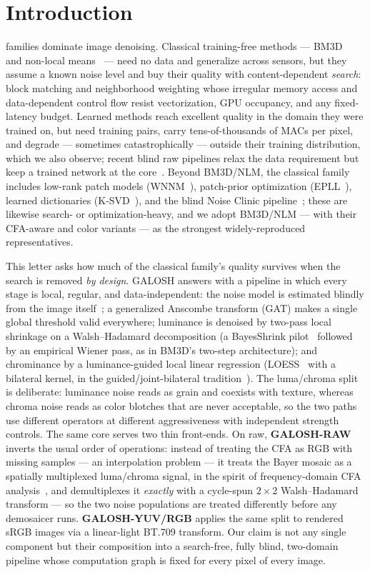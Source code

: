 \documentclass[journal]{IEEEtran}
\begin{document}
\section{Introduction}
 families dominate image denoising. Classical
training-free methods --- BM3D~\cite{bm3d} and non-local means~\cite{nlm} ---
need no data and generalize across sensors, but they assume a known noise
level and buy their quality with content-dependent \emph{search}: block
matching and neighborhood weighting whose irregular memory access and
data-dependent control flow resist vectorization, GPU occupancy, and any
fixed-latency budget. Learned methods reach excellent quality in the domain
they were trained on, but need training pairs, carry tens-of-thousands of MACs
per pixel, and degrade --- sometimes catastrophically --- outside their
training distribution, which we also observe; recent blind raw pipelines
relax the data requirement but keep a trained network at the
core~\cite{yond,noise2vst}. Beyond BM3D/NLM, the classical
family includes low-rank patch models (WNNM~\cite{wnnm}), patch-prior
optimization (EPLL~\cite{epll}), learned dictionaries (K-SVD~\cite{ksvd}), and
the blind Noise Clinic pipeline~\cite{noiseclinic}; these are likewise search-
or optimization-heavy, and we adopt BM3D/NLM --- with their CFA-aware and
color variants --- as the strongest widely-reproduced representatives.

This letter asks how much of the classical family's quality survives when the
search is removed \emph{by design}. GALOSH answers with a pipeline in which
every stage is local, regular, and data-independent: the noise model is
estimated blindly from the image itself~\cite{foi}; a generalized Anscombe
transform (GAT) makes a single global threshold valid everywhere; luminance is
denoised by two-pass local shrinkage on a Walsh--Hadamard decomposition
(a BayesShrink pilot~\cite{bayesshrink} followed by an empirical Wiener pass,
as in BM3D's two-step architecture); and chrominance by a luminance-guided
local linear regression (LOESS~\cite{loess} with a bilateral kernel, in the
guided/joint-bilateral tradition~\cite{kopf,guidedfilter}). The luma/chroma
split is deliberate: luminance noise reads as grain and coexists with texture,
whereas chroma noise reads as color blotches that are never acceptable, so the
two paths use different operators at different aggressiveness with independent
strength controls. The same core serves two thin front-ends. On raw,
\textbf{GALOSH-RAW} inverts the usual order of operations: instead of
treating the CFA as RGB with missing samples --- an interpolation problem
--- it treats the Bayer mosaic as a spatially multiplexed luma/chroma
signal, in the spirit of frequency-domain CFA analysis~\cite{alleysson,dubois,hirakawa},
and demultiplexes it \emph{exactly} with a cycle-spun $2{\times}2$
Walsh--Hadamard transform --- so the two noise populations are treated
differently before any demosaicer runs. \textbf{GALOSH-YUV/RGB} applies
the same split to rendered sRGB images via a linear-light BT.709
transform. Our claim is not any single component but their
composition into a search-free, fully blind, two-domain pipeline whose
computation graph is fixed for every pixel of every image.
\end{document}
